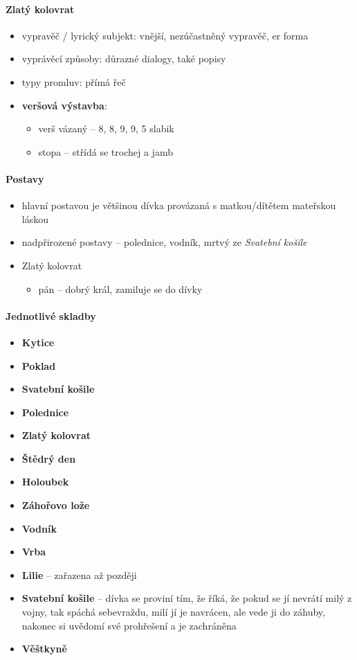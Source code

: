 \documentclass[10pt,a4paper]{article}
\begin{document}
\paragraph{Zlatý kolovrat}
\begin{itemize}
\item vypravěč / lyrický subjekt: vnější, nezúčastněný vypravěč, er forma
\item vyprávěcí způsoby: důrazné dialogy, také popisy
\item typy promluv: přímá řeč
\item \textbf{veršová výstavba}:
	\begin{itemize}
	\item verš vázaný -- 8, 8, 9, 9, 5 slabik
	\item stopa -- střídá se trochej a jamb
	\end{itemize}
\end{itemize}

\paragraph{Postavy}
\begin{itemize}
\item hlavní postavou je většinou dívka provázaná s matkou/dítětem mateřskou láskou
\item nadpřirozené postavy -- polednice, vodník, mrtvý ze \textit{Svatební košile}
\item Zlatý kolovrat
	\begin{itemize}
	\item pán -- dobrý král, zamiluje se do dívky
	\end{itemize}	 
\end{itemize}

\paragraph{Jednotlivé skladby}
\begin{itemize}
\item \textbf{Kytice}
\item \textbf{Poklad}
\item \textbf{Svatební košile}
\item \textbf{Polednice}
\item \textbf{Zlatý kolovrat}
\item \textbf{Štědrý den}
\item \textbf{Holoubek}
\item \textbf{Záhořovo lože}
\item \textbf{Vodník}
\item \textbf{Vrba}
\item \textbf{Lilie} -- zařazena až později
\item \textbf{Svatební košile} -- dívka se proviní tím, že říká, že pokud se jí nevrátí milý z vojny, tak spáchá sebevraždu, milí jí je navrácen, ale vede ji do záhuby, nakonec si uvědomí své prohřešení a je zachráněna
\item \textbf{Věštkyně}
\end{itemize}
\end{document}
